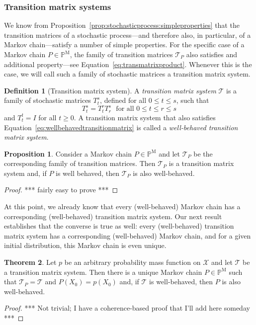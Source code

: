 \documentclass[10pt]{paper}
\theoremstyle{definition}
\newtheorem{theorem}{Theorem}
\newtheorem{proposition}[theorem]{Proposition}
\newtheorem{definition}{Definition}
\newcommand{\states}{\mathcal{X}}
\newcommand{\processes}{\mathbb{P}}
\newcommand{\mprocesses}{\processes^{\mathrm{M}}}
\begin{document}
\subsubsection{Transition matrix systems}

We know from Proposition~\ref{prop:stochasticprocess:simpleproperties} that the transition matrices of a stochastic process---and therefore also, in particular, of a Markov chain---satisfy a number of simple properties. For the specific case of a Markov chain $P\in\mprocesses$, the family of transition matrices $\mathcal{T}_P$ also satisfies and additional property---see Equation~\eqref{eq:transmatrixproduct}. Whenever this is the case, we will call such a family of stochastic matrices a transition matrix system.

\begin{definition}[Transition matrix system]
A \emph{transition matrix system} $\mathcal{T}$ is a family of stochastic matrices $T_t^s$, defined for all $0\leq t\leq s$, such that
\begin{equation}\label{eq:transmatrixproduct}
T_t^s=T_t^r T_r^s
\text{~~for all $0\leq t\leq r\leq s$}
\end{equation}
and $T_t^t=I$ for all $t\geq0$. A transition matrix system that also satisfies Equation~\eqref{eq:wellbehavedtransitionmatrix} is called a \emph{well-behaved transition matrix system}.
\end{definition}

\begin{proposition}
Consider a Markov chain $P\in\mprocesses$ and let $\mathcal{T}_P$ be the corresponding family of transition matrices. Then $\mathcal{T}_P$ is a transition matrix system and, if $P$ is well behaved, then $\mathcal{T}_P$ is also well-behaved.
\end{proposition}
\begin{proof}
*** fairly easy to prove ***
\end{proof}

At this point, we already know that every (well-behaved) Markov chain has a corresponding (well-behaved) transition matrix system. Our next result establishes that the converse is true as well: every (well-behaved) transition matrix system has a corresponding (well-behaved) Markov chain, and for a given initial distribution, this Markov chain is even unique.

\begin{theorem}
 Let $p$ be an arbitrary probability mass function on $\states$ and let $\mathcal{T}$ be a transition matrix system. Then there is a unique Markov chain $P\in\mprocesses$ such that $\mathcal{T}_P=\mathcal{T}$ and $P(X_0)=p(X_0)$ and, if $\mathcal{T}$ is well-behaved, then $P$ is also well-behaved.
\end{theorem}
\begin{proof}
*** Not trivial; I have a coherence-based proof that I'll add here someday ***
\end{proof}
\end{document}
